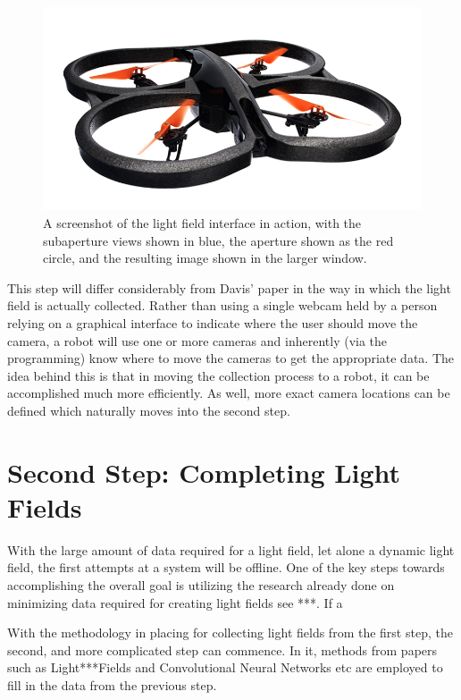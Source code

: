 \documentclass[12pt]{report}
\begin{document}
\begin{figure}[!ht]
	\centering
	\includegraphics[scale=0.4]{ardrone_image.png}
	\caption{A screenshot of the light field interface in action, with the subaperture views shown in blue, the aperture shown as the red circle, and the resulting image shown in the larger window.}
	\label{fig:ardrone_image}
\end{figure}

This step will differ considerably from Davis' paper in the way in which the light field is actually collected. Rather than using a single webcam held by a person relying on a graphical interface to indicate where the user should move the camera, a robot will use one or more cameras and inherently (via the programming) know where to move the cameras to get the appropriate data. The idea behind this is that in moving the collection process to a robot, it can be accomplished much more efficiently. As well, more exact camera locations can be defined which naturally moves into the second step.

\section{Second Step: Completing Light Fields}
With the large amount of data required for a light field, let alone a dynamic light field, the first attempts at a system will be offline. One of the key steps towards accomplishing the overall goal is utilizing the research already done on minimizing data required for creating light fields see ***. If a  

With the methodology in placing for collecting light fields from the first step, the second, and more complicated step can commence. In it, methods from papers such as Light***Fields and Convolutional Neural Networks etc are employed to fill in the data from the previous step.
\end{document}
